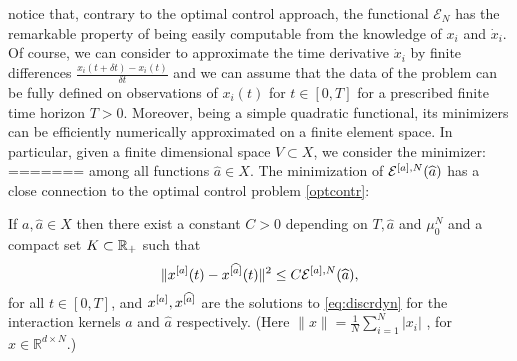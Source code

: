 notice that, contrary to the optimal control approach, the functional $\mathcal E_N$ has the remarkable property of being easily computable from the knowledge of $x_i$ and $\dot{x}_i$. Of course, we can consider to approximate the time derivative $\dot{x}_i$ by finite differences $\frac{x_i(t+\delta t)- x_i(t)}{\delta t}$ and we can assume that the data of the problem can be fully defined on observations of $x_i(t)$ for $t \in [0,T]$ for a prescribed finite time horizon $T>0$. Moreover, being a simple quadratic functional, its minimizers can be efficiently numerically approximated on a finite element space. In particular, given a finite dimensional space $V \subset X$, we consider the minimizer:
=======
among all functions $\widehat a \in X$. 
The minimization of $\mathcal E^{[a],N}(\widehat a)$ has a close connection to the optimal control problem \eqref{optcontr}:
\begin{proposition}\label{trajapprox}
If $a,\widehat a \in X$ then there exist a constant $C>0$ depending on $T,\widehat a$ and $\mu_0^N$ and a compact set $K \subset \mathbb{R}_+$ such that
\begin{equation}\label{eq:trajapprox}
\| x^{[a]} (t) -x^{[\widehat a]}  (t) \|^2 \leq C {\mathcal E^{[a],N}(\widehat a)}, 
\end{equation}
for all $t \in [0,T]$, and $x^{[a]} , x^{[\widehat a]}  $ are the solutions to \eqref{eq:discrdyn} for the interaction kernels $a$ and $\widehat a$ respectively. (Here $\| x \| = \frac{1}{N} \sum_{i=1}^N |x_i|$ , for $x \in \mathbb R^{d \times N}$.)
\end{proposition}



